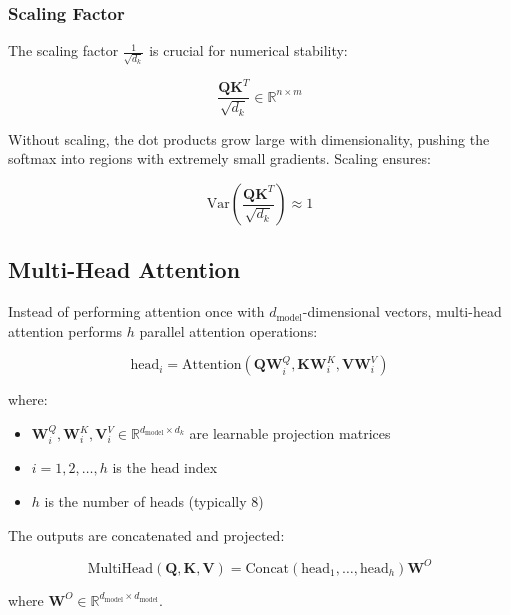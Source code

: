 \documentclass[11pt,a4paper]{article}
\begin{document}
\subsubsection{Scaling Factor}

The scaling factor $\frac{1}{\sqrt{d_k}}$ is crucial for numerical stability:

\begin{equation}
\frac{\mathbf{Q}\mathbf{K}^T}{\sqrt{d_k}} \in \mathbb{R}^{n \times m}
\end{equation}

Without scaling, the dot products grow large with dimensionality, pushing the softmax into regions with extremely small gradients. Scaling ensures:

\begin{equation}
\text{Var}\left(\frac{\mathbf{Q}\mathbf{K}^T}{\sqrt{d_k}}\right) \approx 1
\end{equation}

\subsection{Multi-Head Attention}

Instead of performing attention once with $d_{\text{model}}$-dimensional vectors, multi-head attention performs $h$ parallel attention operations:

\begin{equation}
\text{head}_i = \text{Attention}(\mathbf{Q}\mathbf{W}_i^Q, \mathbf{K}\mathbf{W}_i^K, \mathbf{V}\mathbf{W}_i^V)
\end{equation}

where:
\begin{itemize}
    \item $\mathbf{W}_i^Q, \mathbf{W}_i^K, \mathbf{V}_i^V \in \mathbb{R}^{d_{\text{model}} \times d_k}$ are learnable projection matrices
    \item $i = 1, 2, \ldots, h$ is the head index
    \item $h$ is the number of heads (typically 8)
\end{itemize}

The outputs are concatenated and projected:

\begin{equation}
\text{MultiHead}(\mathbf{Q}, \mathbf{K}, \mathbf{V}) = \text{Concat}(\text{head}_1, \ldots, \text{head}_h)\mathbf{W}^O
\end{equation}

where $\mathbf{W}^O \in \mathbb{R}^{d_{\text{model}} \times d_{\text{model}}}$.
\end{document}
